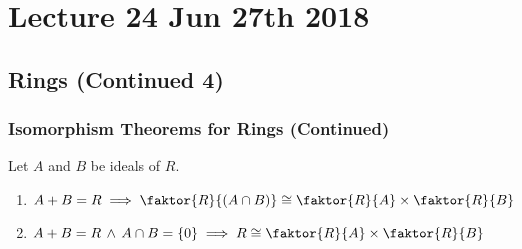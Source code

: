 \chapter{Lecture 24 Jun 27th 2018}%
\label{chp:lecture_24_jun_27th_2018}

\section{Rings (Continued 4)}%
\label{sec:rings_continued_4}

\subsection{Isomorphism Theorems for Rings (Continued)}%
\label{sub:isomorphism_theorems_for_rings_continued}

\begin{thm}
\label{thm:chinese_remainder_theorem}
  Let $A$ and $B$ be ideals of $R$.
  \begin{enumerate}
    \item $A + B = R \implies \faktor{R}{(A \cap B)} \cong \faktor{R}{A} \times \faktor{R}{B}$
    \item $A + B = R \, \land \, A \cap B = \{0\} \implies R \cong \faktor{R}{A} \times \faktor{R}{B}$
  \end{enumerate}
\end{thm}

